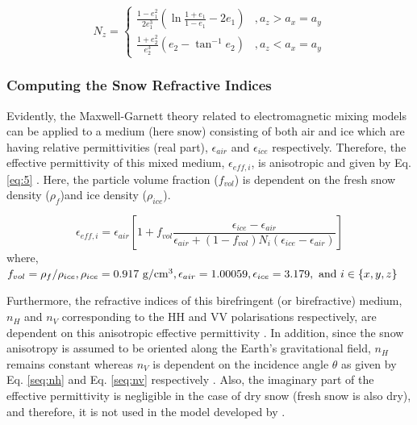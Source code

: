 \documentclass[review]{elsarticle}
\numberwithin{equation}{section}
\numberwithin{figure}{section}
\numberwithin{table}{section}
\begin{document}
\begin{equation}
    \label{eq:4}
	N_z = \begin{cases} 
          \frac{1 - e_1^2}{2e_1^3}\left(\ln{\frac{1 + e_1}{1 - e_1} - 2e_1}\right) &, a_z > a_x = a_y \\
          \frac{1 + e_2^2}{e_2^3}\left(e_2 - \tan^{-1}e_2\right) &, a_z < a_x = a_y
       \end{cases}
\end{equation}

\subsubsection{Computing the Snow Refractive Indices}

Evidently, the Maxwell-Garnett theory related to electromagnetic mixing models can be applied to a medium (here snow) consisting of both air and ice which are having relative permittivities (real part), $\epsilon_{air}$ and $\epsilon_{ice}$ respectively. Therefore, the effective permittivity of this mixed medium, $\epsilon_{eff, i}$, is anisotropic and given by Eq. \eqref{eq:5} \citep{Leinss2014, Sihvola1999}. Here, the particle volume fraction ($f_{vol}$) is dependent on the fresh snow density ($\rho_f$)and ice density ($\rho_{ice}$). 

\begin{equation}
    \label{eq:5}
	\epsilon_{eff, i} = \epsilon_{air}\left[1 + f_{vol}\frac{\epsilon_{ice} - \epsilon_{air}}{\epsilon_{air} + \left(1 - f_{vol}\right)N_i\left(\epsilon_{ice} - \epsilon_{air}\right)}\right]
\end{equation}
where, $f_{vol} = \rho_f / {\rho_{ice}}, \rho_{ice} = 0.917 \text{ g/cm\textsuperscript{3}}, \epsilon_{air} = 1.00059, \epsilon_{ice} = 3.179, \text{ and } i \in \{x, y, z\}$

Furthermore, the refractive indices of this birefringent (or birefractive) medium, $n_H$ and $n_V$ corresponding to the HH and VV polarisations respectively, are dependent on this anisotropic effective permittivity \citep{Leinss2014}. In addition, since the snow anisotropy is assumed to be oriented along the Earth’s gravitational field, $n_H$ remains constant whereas $n_V$ is dependent on the incidence angle $\theta$ as given by Eq. \eqref{seq:nh} and Eq. \eqref{seq:nv} respectively \citep{Leinss2016}. Also, the imaginary part of the effective permittivity is negligible in the case of dry snow (fresh snow is also dry), and therefore, it is not used in the model developed by \cite{Leinss2014}.
\end{document}
